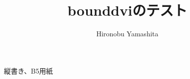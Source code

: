 \documentclass[b5paper]{tarticle}
\title{\textsf{bounddvi}のテスト}
\author{Hironobu Yamashita}
\begin{document}
縦書き、B5用紙
\end{document}
